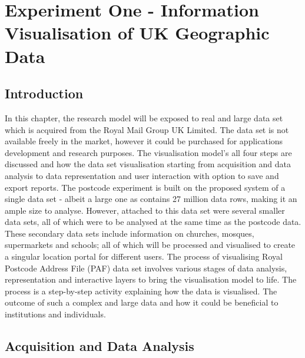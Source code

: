 
\chapter{Experiment One - Information Visualisation of UK Geographic Data} %

\label{Chapter5} %



\section{Introduction}

In this chapter, the research model will be exposed to real and large data set which is acquired from the Royal Mail Group UK Limited. The data set is not available freely in the market, however it could be purchased for applications development and research purposes. The visualisation model's all four steps are discussed and how the data set visualisation starting from acquisition and data analysis to data representation and user interaction with option to save and export reports. The postcode experiment is built on the proposed system of a single data set - albeit a large one as contains 27 million data rows, making it an ample size to analyse. However, attached to this data set were several smaller data sets, all of which were to be analysed at the same time as the postcode data. These secondary data sets include information on churches, mosques, supermarkets and schools; all of which will be processed and visualised to create a singular location portal for different users. The process of visualising Royal Postcode Address File (PAF) data set involves various stages of data analysis, representation and interactive layers to bring the visualisation model to life. The process is a step-by-step activity explaining how the data is visualised. The outcome of such a complex and large data and how it could be beneficial to institutions and individuals. 

\section{Acquisition and Data Analysis}

